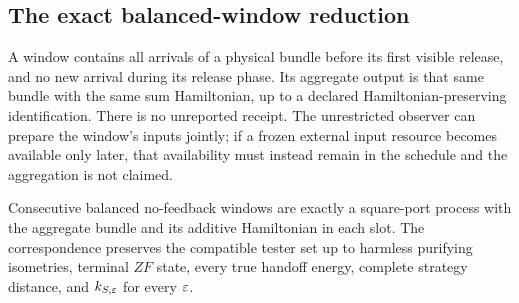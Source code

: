 \subsection{The exact balanced-window reduction}
\begin{definition}\label{to:sc-def:window}
A window contains all arrivals of a physical bundle before its first visible release, and no new arrival during its release phase. Its aggregate output is that same bundle with the same sum Hamiltonian, up to a declared Hamiltonian-preserving identification. There is no unreported receipt. The unrestricted observer can prepare the window's inputs jointly; if a frozen external input resource becomes available only later, that availability must instead remain in the schedule and the aggregation is not claimed.
\end{definition}
\begin{lemma}\label{to:sc-lem:windows}
Consecutive balanced no-feedback windows are exactly a square-port process with the aggregate bundle and its additive Hamiltonian in each slot. The correspondence preserves the compatible tester set up to harmless purifying isometries, terminal $ZF$ state, every true handoff energy, complete strategy distance, and $k_{S,\varepsilon}$ for every $\varepsilon$.
\end{lemma}
